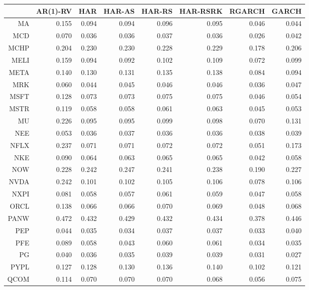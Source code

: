 \begin{table}[ht]
\centering
\begin{tabular}{rrrrrrrr}
  \hline
 & AR(1)-RV & HAR & HAR-AS & HAR-RS & HAR-RSRK & RGARCH & GARCH \\ 
  \hline
MA & 0.155 & 0.094 & 0.094 & 0.096 & 0.095 & 0.046 & 0.044 \\ 
  MCD & 0.070 & 0.036 & 0.036 & 0.037 & 0.036 & 0.026 & 0.042 \\ 
  MCHP & 0.204 & 0.230 & 0.230 & 0.228 & 0.229 & 0.178 & 0.206 \\ 
  MELI & 0.159 & 0.094 & 0.092 & 0.102 & 0.109 & 0.072 & 0.099 \\ 
  META & 0.140 & 0.130 & 0.131 & 0.135 & 0.138 & 0.084 & 0.094 \\ 
  MRK & 0.060 & 0.044 & 0.045 & 0.046 & 0.046 & 0.036 & 0.047 \\ 
  MSFT & 0.128 & 0.073 & 0.073 & 0.075 & 0.075 & 0.046 & 0.054 \\ 
  MSTR & 0.119 & 0.058 & 0.058 & 0.061 & 0.063 & 0.045 & 0.053 \\ 
  MU & 0.226 & 0.095 & 0.095 & 0.099 & 0.098 & 0.070 & 0.131 \\ 
  NEE & 0.053 & 0.036 & 0.037 & 0.036 & 0.036 & 0.038 & 0.039 \\ 
  NFLX & 0.237 & 0.071 & 0.071 & 0.072 & 0.072 & 0.051 & 0.173 \\ 
  NKE & 0.090 & 0.064 & 0.063 & 0.065 & 0.065 & 0.042 & 0.058 \\ 
  NOW & 0.228 & 0.242 & 0.247 & 0.241 & 0.238 & 0.190 & 0.227 \\ 
  NVDA & 0.242 & 0.101 & 0.102 & 0.105 & 0.106 & 0.078 & 0.106 \\ 
  NXPI & 0.081 & 0.058 & 0.057 & 0.061 & 0.059 & 0.047 & 0.058 \\ 
  ORCL & 0.138 & 0.066 & 0.066 & 0.070 & 0.069 & 0.048 & 0.068 \\ 
  PANW & 0.472 & 0.432 & 0.429 & 0.432 & 0.434 & 0.378 & 0.446 \\ 
  PEP & 0.044 & 0.035 & 0.034 & 0.037 & 0.037 & 0.033 & 0.040 \\ 
  PFE & 0.089 & 0.058 & 0.043 & 0.060 & 0.061 & 0.034 & 0.035 \\ 
  PG & 0.040 & 0.036 & 0.035 & 0.039 & 0.039 & 0.031 & 0.027 \\ 
  PYPL & 0.127 & 0.128 & 0.130 & 0.136 & 0.140 & 0.102 & 0.121 \\ 
  QCOM & 0.114 & 0.070 & 0.070 & 0.070 & 0.068 & 0.056 & 0.075 \\ 

\end{tabular}
\end{table}
